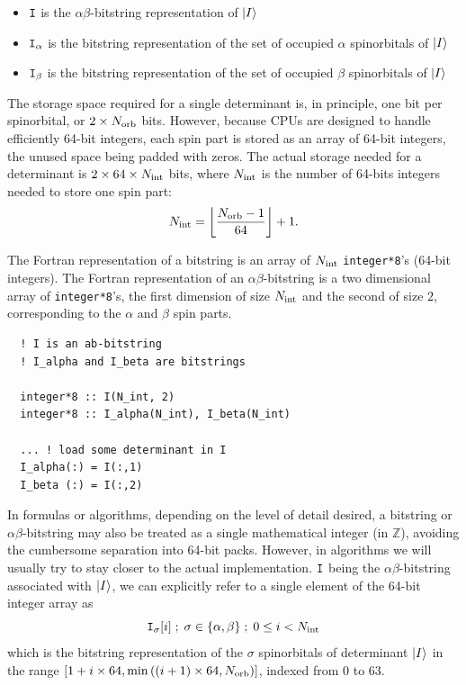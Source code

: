 \documentclass[./thesis.tex]{subfiles}
\begin{document}
\begin{itemize}
\item
${\texttt{I}}$ is the $\alpha \beta$-bitstring representation of ${\ket{I}}$
\item
${\texttt{I}}_\alpha$ is the bitstring representation of the set of occupied $\alpha$ spinorbitals of ${\ket{I}}$ 
\item
${\texttt{I}}_\beta$ is the bitstring representation of the set of occupied $\beta$ spinorbitals of ${\ket{I}}$ 

\end{itemize}


The storage space required for a single determinant is, in principle, one bit per spinorbital, or $2 \times {N_\text{orb}}$ bits. However, because CPUs are designed to handle efficiently 64-bit integers, each spin part is stored as an array of 64-bit integers, the unused space being padded with zeros. 
The actual storage needed for a determinant is $2 \times 64 \times {N_\text{int}}$ bits, where ${N_\text{int}}$ is the number of 64-bits integers needed to store one spin part:
\begin{equation}
{N_\text{int}} = \left \lfloor \frac{{N_\text{orb}}-1}{64} \right \rfloor + 1.
\end{equation}


The Fortran representation of a bitstring is an array of ${N_\text{int}}$ \lstinline{integer*8}'s (64-bit integers).  
The Fortran representation of an $\alpha \beta$-bitstring is a two dimensional array of \lstinline{integer*8}'s, the first dimension of size ${N_\text{int}}$ and the second of size $2$, corresponding to the $\alpha$ and $\beta$ spin parts.


\lstset{frame=single}
\begin{lstlisting}
  ! I is an ab-bitstring
  ! I_alpha and I_beta are bitstrings
  
  integer*8 :: I(N_int, 2)
  integer*8 :: I_alpha(N_int), I_beta(N_int)

  ... ! load some determinant in I
  I_alpha(:) = I(:,1)
  I_beta (:) = I(:,2)
\end{lstlisting}
\lstset{frame=none}


In formulas or algorithms, depending on the level of detail desired, a bitstring or $\alpha\beta$-bitstring may also be treated as a single mathematical integer (in $\mathbb{Z}$), avoiding the cumbersome separation into 64-bit packs. However, in algorithms we will usually try to stay closer to the actual implementation. ${\texttt{I}}$ being the $\alpha  \beta$-bitstring associated with ${\ket{I}}$, we can explicitly refer to a single element of the 64-bit integer array as
\begin{equation}
{\texttt{I}}_{\sigma}[i]\; ;\; \sigma \in \{\alpha, \beta\}\; ;\; 0 \le i < {N_\text{int}}
\end{equation}
which is the bitstring representation of the $\sigma$ spinorbitals of determinant ${\ket{I}}$ in the range $[1+i \times 64, \min \left( (i+1) \times 64, {N_\text{orb}} \right)]$, indexed from $0$ to $63$.
\end{document}
